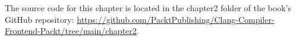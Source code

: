 The source code for this chapter is located in the chapter2 folder of the book's GitHub repository: \url{https://github.com/PacktPublishing/Clang-Compiler-Frontend-Packt/tree/main/chapter2}.
